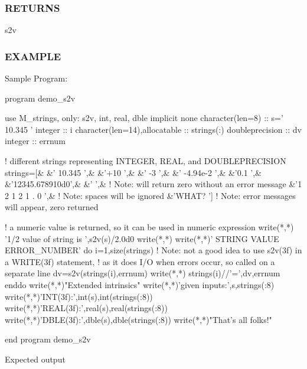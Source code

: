 \subsubsection*{R\+E\+T\+U\+R\+NS}

s2v

\subsubsection*{E\+X\+A\+M\+P\+LE}

\begin{DoxyVerb}Sample Program:

 program demo_s2v

 use M_strings, only: s2v, int, real, dble
 implicit none
 character(len=8)              :: s=' 10.345 '
 integer                       :: i
 character(len=14),allocatable :: strings(:)
 doubleprecision               :: dv
 integer                       :: errnum

 ! different strings representing INTEGER, REAL, and DOUBLEPRECISION
 strings=[&
 &' 10.345       ',&
 &'+10           ',&
 &'    -3        ',&
 &'    -4.94e-2  ',&
 &'0.1           ',&
 &'12345.678910d0',&
 &'              ',& ! Note: will return zero without an error message
 &'1 2 1 2 1 . 0 ',& ! Note: spaces will be ignored
 &'WHAT?         ']  ! Note: error messages will appear, zero returned

 ! a numeric value is returned, so it can be used in numeric expression
 write(*,*) '1/2 value of string is ',s2v(s)/2.0d0
 write(*,*)
 write(*,*)' STRING            VALUE                    ERROR_NUMBER'
 do i=1,size(strings)
    ! Note: not a good idea to use s2v(3f) in a WRITE(3f) statement,
    ! as it does I/O when errors occur, so called on a separate line
    dv=s2v(strings(i),errnum)
    write(*,*) strings(i)//'=',dv,errnum
 enddo
 write(*,*)"Extended intrinsics"
 write(*,*)'given inputs:',s,strings(:8)
 write(*,*)'INT(3f):',int(s),int(strings(:8))
 write(*,*)'REAL(3f):',real(s),real(strings(:8))
 write(*,*)'DBLE(3f):',dble(s),dble(strings(:8))
 write(*,*)"That's all folks!"

 end program demo_s2v

Expected output


\end{DoxyVerb}
